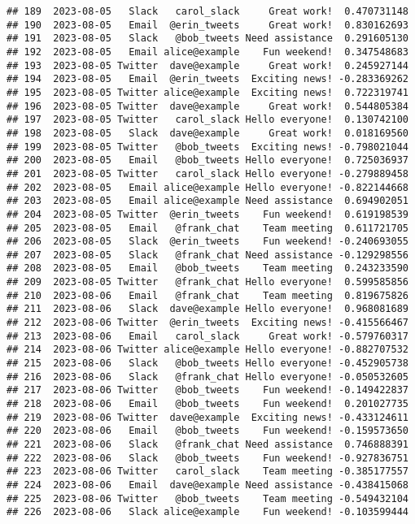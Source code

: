 \documentclass[
]{article}
\begin{document}
\begin{verbatim}
## 189  2023-08-05   Slack   carol_slack     Great work!  0.470731148
## 190  2023-08-05   Email  @erin_tweets     Great work!  0.830162693
## 191  2023-08-05   Slack   @bob_tweets Need assistance  0.291605130
## 192  2023-08-05   Email alice@example    Fun weekend!  0.347548683
## 193  2023-08-05 Twitter  dave@example     Great work!  0.245927144
## 194  2023-08-05   Email  @erin_tweets  Exciting news! -0.283369262
## 195  2023-08-05 Twitter alice@example  Exciting news!  0.722319741
## 196  2023-08-05 Twitter  dave@example     Great work!  0.544805384
## 197  2023-08-05 Twitter   carol_slack Hello everyone!  0.130742100
## 198  2023-08-05   Slack  dave@example     Great work!  0.018169560
## 199  2023-08-05 Twitter   @bob_tweets  Exciting news! -0.798021044
## 200  2023-08-05   Email   @bob_tweets Hello everyone!  0.725036937
## 201  2023-08-05 Twitter   carol_slack Hello everyone! -0.279889458
## 202  2023-08-05   Email alice@example Hello everyone! -0.822144668
## 203  2023-08-05   Email alice@example Need assistance  0.694902051
## 204  2023-08-05 Twitter  @erin_tweets    Fun weekend!  0.619198539
## 205  2023-08-05   Email   @frank_chat    Team meeting  0.611721705
## 206  2023-08-05   Slack  @erin_tweets    Fun weekend! -0.240693055
## 207  2023-08-05   Slack   @frank_chat Need assistance -0.129298556
## 208  2023-08-05   Email   @bob_tweets    Team meeting  0.243233590
## 209  2023-08-05 Twitter   @frank_chat Hello everyone!  0.599585856
## 210  2023-08-06   Email   @frank_chat    Team meeting  0.819675826
## 211  2023-08-06   Slack  dave@example Hello everyone!  0.968081689
## 212  2023-08-06 Twitter  @erin_tweets  Exciting news! -0.415566467
## 213  2023-08-06   Email   carol_slack     Great work! -0.579760317
## 214  2023-08-06 Twitter alice@example Hello everyone! -0.882707532
## 215  2023-08-06   Slack   @bob_tweets Hello everyone! -0.452905738
## 216  2023-08-06   Slack   @frank_chat Hello everyone! -0.050532605
## 217  2023-08-06 Twitter   @bob_tweets    Fun weekend! -0.149422837
## 218  2023-08-06   Email   @bob_tweets    Fun weekend!  0.201027735
## 219  2023-08-06 Twitter  dave@example  Exciting news! -0.433124611
## 220  2023-08-06   Email   @bob_tweets    Fun weekend! -0.159573650
## 221  2023-08-06   Slack   @frank_chat Need assistance  0.746888391
## 222  2023-08-06   Slack   @bob_tweets    Fun weekend! -0.927836751
## 223  2023-08-06 Twitter   carol_slack    Team meeting -0.385177557
## 224  2023-08-06   Email  dave@example Need assistance -0.438415068
## 225  2023-08-06 Twitter   @bob_tweets    Team meeting -0.549432104
## 226  2023-08-06   Slack alice@example    Fun weekend! -0.103599444

\end{verbatim}
\end{document}
